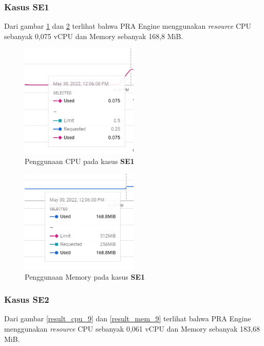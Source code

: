 \pagebreak

\subsubsection{Kasus SE1}
Dari gambar \ref{result_cpu_8} dan \ref{result_mem_8} terlihat bahwa PRA Engine menggunakan \textit{resource} CPU sebanyak 0,075 vCPU dan Memory sebanyak 168,8 MiB. 

\begin{figure}[!htb]
	\centering
	\includegraphics[width=0.5\textwidth]{resources/ch4/resource/8-cpu.png}
	\caption{Penggunaan CPU pada kasus \textbf{SE1}}
	\label{result_cpu_8}
\end{figure}

\begin{figure}[!htb]
	\centering
	\includegraphics[width=0.5\textwidth]{resources/ch4/resource/8-mem.png}
	\caption{Penggunaan Memory pada kasus \textbf{SE1}}
	\label{result_mem_8}
\end{figure}

\pagebreak

\subsubsection{Kasus SE2}
Dari gambar \ref{result_cpu_9} dan \ref{result_mem_9} terlihat bahwa PRA Engine menggunakan \textit{resource} CPU sebanyak 0,061 vCPU dan Memory sebanyak 183,68 MiB. 

